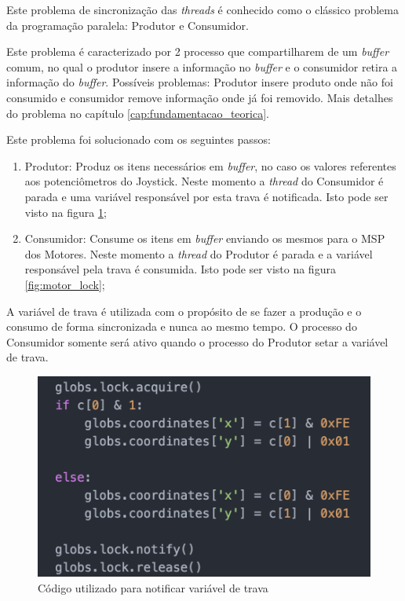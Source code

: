   Este problema de sincronização das \textit{threads} é conhecido como o clássico problema da programação paralela: Produtor e Consumidor.

  Este problema é caracterizado por 2 processo que compartilharem de um \textit{buffer} comum, no qual o produtor insere a informação no \textit{buffer} e o consumidor retira a informação do \textit{buffer}. Possíveis problemas: Produtor insere produto onde não foi consumido e consumidor remove informação onde já foi removido. Mais detalhes do problema no capítulo \ref{cap:fundamentacao_teorica}.

  Este problema foi solucionado com os seguintes passos:
  \begin{enumerate}
    \item Produtor: Produz os itens necessários em \textit{buffer}, no caso os valores referentes aos potenciômetros do Joystick. Neste momento a \textit{thread} do Consumidor é parada e uma variável responsável por esta trava é notificada. Isto pode ser visto na figura \ref{fig:joy_lock};
    \item Consumidor: Consume os itens em \textit{buffer} enviando os mesmos para o MSP dos Motores. Neste momento a \textit{thread} do Produtor é parada e a variável responsável pela trava é consumida. Isto pode ser visto na figura \ref{fig:motor_lock};
  \end{enumerate}

  A variável de trava é utilizada com o propósito de se fazer a produção e o consumo de forma sincronizada e nunca ao mesmo tempo. O processo do Consumidor somente será ativo quando o processo do Produtor setar a variável de trava.

  \begin{figure}[!htb]
  \centering
  \includegraphics[keepaspectratio=true,scale=0.5]{figuras/resultados/joy_lock}
  \caption{Código utilizado para notificar variável de trava}
  \label{fig:joy_lock}
  \end{figure}


